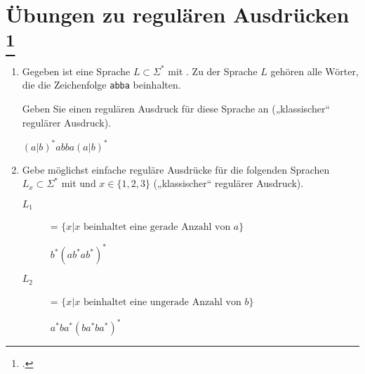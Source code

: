 \documentclass{lehramt-informatik-aufgabe}
\begin{document}
\section{Übungen zu regulären Ausdrücken
\footcite[Seite 21]{theo:fs:1}}

\begin{enumerate}

%

\item Gegeben ist eine Sprache $L \subset \Sigma^*$ mit
. Zu der Sprache $L$ gehören alle Wörter, die die
Zeichenfolge \texttt{abba} beinhalten.

Geben Sie einen regulären Ausdruck für diese Sprache an („klassischer“
regulärer Ausdruck).

\begin{liAntwort}
$(a|b)^*abba(a|b)^*$

\end{liAntwort}

%

\item Gebe möglichst einfache reguläre Ausdrücke für die folgenden
Sprachen $L_x \subset \Sigma^*$ mit  und $x \in \{1, 2, 3\}$ („klassischer“ regulärer Ausdruck).

\begin{description}

%

\item[$L_1$] = $\{ x | x \text{ beinhaltet eine gerade Anzahl von } a \}$

\begin{liAntwort}
$b^*(ab^*ab^*)^*$

\end{liAntwort}

%

\item[$L_2$] = $\{ x | x \text{ beinhaltet eine ungerade Anzahl von } b \}$

\begin{liAntwort}
$a^*ba^*(ba^*ba^*)^*$

\end{liAntwort}


\end{description}
\end{enumerate}
\end{document}
